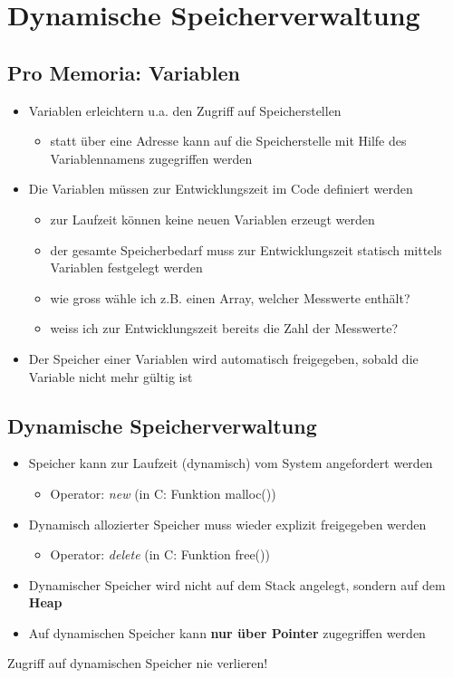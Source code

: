 \section{Dynamische Speicherverwaltung}

\subsection{Pro Memoria: Variablen}
\begin{itemize}
	\item Variablen erleichtern u.a. den Zugriff auf Speicherstellen
	\begin{itemize}
		\item statt über eine Adresse kann auf die Speicherstelle mit Hilfe des Variablennamens zugegriffen werden
	\end{itemize}
	\item Die Variablen müssen zur Entwicklungszeit im Code definiert werden
	\begin{itemize}
		\item zur Laufzeit können keine neuen Variablen erzeugt werden
		\item der gesamte Speicherbedarf muss zur Entwicklungszeit statisch mittels Variablen festgelegt werden
		\item wie gross wähle ich z.B. einen Array, welcher Messwerte enthält?
		\item weiss ich zur Entwicklungszeit bereits die Zahl der Messwerte?
	\end{itemize}
	\item Der Speicher einer Variablen wird automatisch freigegeben, sobald die Variable nicht mehr gültig ist
\end{itemize}

\subsection{Dynamische Speicherverwaltung}
\begin{itemize}
	\item Speicher kann zur Laufzeit (dynamisch) vom System angefordert werden
	\begin{itemize}
		\item Operator: \emph{new} (in C: Funktion malloc())
	\end{itemize}
	\item Dynamisch allozierter Speicher muss wieder explizit freigegeben werden
	\begin{itemize}
		\item Operator: \emph{delete} (in C: Funktion free())
	\end{itemize}
	\item Dynamischer Speicher wird nicht auf dem Stack angelegt, sondern auf dem \textbf{Heap}
	\item Auf dynamischen Speicher kann \textbf{nur über Pointer} zugegriffen werden
\end{itemize}
\begin{achtung}
Zugriff auf dynamischen Speicher nie verlieren!
\end{achtung}

